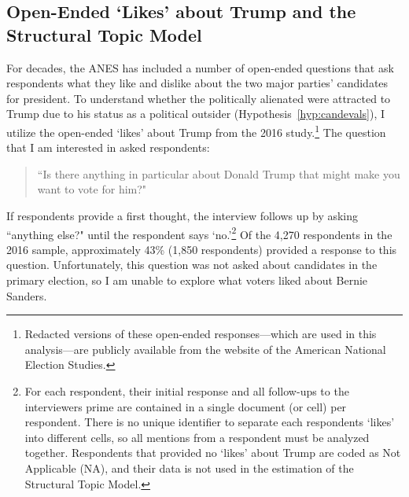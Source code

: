 \documentclass[12pt]{article}
\begin{document}

\subsection{Open-Ended `Likes' about Trump and the Structural Topic Model}
For decades, the ANES has included a number of open-ended questions that ask respondents what they like and dislike about the two major parties' candidates for president. To understand whether the politically alienated were attracted to Trump due to his status as a political outsider (Hypothesis~\ref{hyp:candevals}), I utilize the open-ended `likes' about Trump from the 2016 study.\footnote{Redacted versions of these open-ended responses---which are used in this analysis---are publicly available from the website of the American National Election Studies.} The question that I am interested in asked respondents:

\begin{quote}
``Is there anything in particular about Donald Trump that might make you want to vote for him?"
\end{quote}

\noindent If respondents provide a first thought, the interview follows up by asking ``anything else?" until the respondent says `no.'\footnote{For each respondent, their initial response and all follow-ups to the interviewers prime are contained in a single document (or cell) per respondent. There is no unique identifier to separate each respondents `likes' into different cells, so all mentions from a respondent must be analyzed together. Respondents that provided no `likes' about Trump are coded as Not Applicable (NA), and their data is not used in the estimation of the Structural Topic Model.} Of the 4,270 respondents in the 2016 sample, approximately 43\% (1,850 respondents) provided a response to this question. Unfortunately, this question was not asked about candidates in the primary election, so I am unable to explore what voters liked about Bernie Sanders. 
\end{document}

